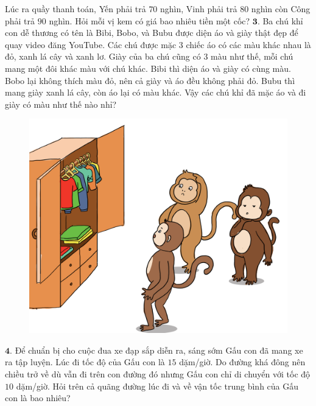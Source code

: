 \begin{multicols}{2}
\begin{figure}[H]
		\vspace*{-5pt}
	\end{figure}
	Lúc ra quầy thanh toán, Yến phải trả $70$ nghìn, Vinh phải trả $80$ nghìn còn Công phải trả $90$ nghìn. Hỏi mỗi vị kem có giá bao nhiêu tiền một cốc?
	\vskip 0.1cm
	$\pmb{3.}$ Ba chú khỉ con dễ thương có tên là Bibi, Bobo, và Bubu được diện áo và giày thật đẹp để quay video đăng YouTube. Các chú được mặc $3$ chiếc áo có các màu khác nhau là đỏ, xanh lá cây và xanh lơ. Giày của ba chú cũng có $3$ màu như thế, mỗi chú mang một đôi khác màu với chú khác. Bibi thì diện áo và giày có cùng màu. Bobo lại không thích màu đỏ, nên cả giày và áo đều không phải đỏ. Bubu thì mang giày xanh lá cây, còn áo lại có màu khác. Vậy các chú khỉ đã mặc áo và đi giày có màu như thế nào nhỉ?
	\begin{figure}[H]
		\centering
		\vspace*{-5pt}
		\captionsetup{labelformat= empty, justification=centering}
		\includegraphics[width=1\linewidth]{bai3}
		\vspace*{-15pt}
	\end{figure}
	$\pmb{4.}$ Để chuẩn bị cho cuộc đua xe đạp sắp diễn ra, sáng sớm Gấu con đã mang xe ra tập luyện. Lúc đi tốc độ của Gấu con là $15$ dặm/giờ. Do đường khá đông nên chiều trở về dù vẫn đi trên con đường đó nhưng Gấu con chỉ di chuyển với tốc độ $10$ dặm/giờ. Hỏi trên cả quãng đường lúc đi và về vận tốc trung bình của Gấu con là bao nhiêu?
	\begin{figure}[H]
		\centering
		\vspace*{5pt}

\end{figure}
\end{multicols}

